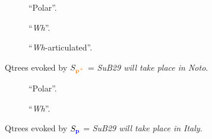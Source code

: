 \begin{figure}[H]
	\centering
	\begin{subfigure}[b]{.2\linewidth}
		\centering
		\caption[]{``Polar''.}\label{fig5:qtree-noto-polar}
	\end{subfigure}\hfill
	\begin{subfigure}[b]{.37\linewidth}
		\centering
		\caption[]{``\textit{Wh}''.}\label{fig5:qtree-noto-wh}
	\end{subfigure}\hfill
	\begin{subfigure}[b]{.37\linewidth}
		\centering
		\caption[]{``\textit{Wh}-articulated''.}\label{fig5:qtree-noto-tiered}
	\end{subfigure}
	\caption[]{Qtrees evoked by $S_{\textbf{\textcolor{orange}{p$^+$}}}$ = \textit{SuB29 will take place in Noto}.}\label{fig5:qtrees-noto}
\end{figure}
\begin{figure}[H]
	\centering

	\begin{subfigure}[b]{.45\linewidth}
		\centering
		\caption[]{``Polar''.}\label{fig5:qtree-italy-polar}
	\end{subfigure}\hfill
	\begin{subfigure}[b]{.45\linewidth}
		\centering
		\caption[]{``\textit{Wh}''.}\label{fig5:qtree-italy-wh}
	\end{subfigure}
	\caption[]{Qtrees evoked by $S_{\textbf{\textcolor{blue}{p}}}$ = \textit{SuB29 will take place in Italy}.}\label{fig5:qtrees-italy}
\end{figure}

